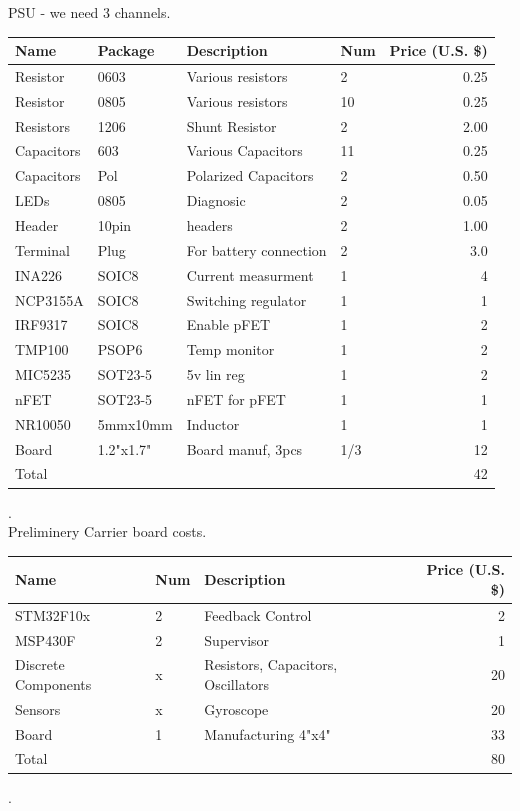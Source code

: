 \documentclass[12pt]{article}
\begin{document}
 PSU - we need 3 channels.\\
\begin{tabular}{| l | l||l|l | r | }
  \hline                       
    Name & Package & Description & Num &Price (U.S. \$) \\ \hline
    Resistor& 0603&Various resistors&2&0.25 \\
    Resistor& 0805&Various resistors&10&0.25\\
    Resistors&1206&Shunt Resistor&2&2.00\\
    Capacitors&603&Various Capacitors&11&0.25\\
    Capacitors&Pol&Polarized Capacitors&2&0.50\\
    LEDs&0805&Diagnosic&2&0.05\\
    Header&10pin&headers&2&1.00\\
    Terminal&Plug&For battery connection&2&3.0\\ 
    INA226&SOIC8&Current measurment&1&4\\
    NCP3155A&SOIC8&Switching regulator&1&1\\
    IRF9317&SOIC8&Enable pFET&1&2\\
    TMP100&PSOP6&Temp monitor&1&2\\
    MIC5235&SOT23-5&5v lin reg&1&2\\
    nFET&SOT23-5&nFET for pFET&1&1\\
    NR10050&5mmx10mm&Inductor&1&1\\
    Board&1.2"x1.7"&Board manuf, 3pcs&1/3&12\\ \hline
     Total&&&&42\\
   \hline  
   \end{tabular}.\\

Preliminery Carrier board costs.\\
\begin{tabular}{| l || l | l |r | }
  \hline                       
     Name &Num &Description & Price (U.S. \$) \\ \hline
     STM32F10x&2 & Feedback Control& 2 \\
     MSP430F  &2 & Supervisor & 1 \\
     Discrete Components&x&Resistors, Capacitors, Oscillators& 20\\ 
     Sensors&x&Gyroscope&20\\
     Board&1&Manufacturing 4"x4"& 33\\ \hline
     Total  &&&80\\
   \hline  
   \end{tabular}.\\
 
\end{document}
